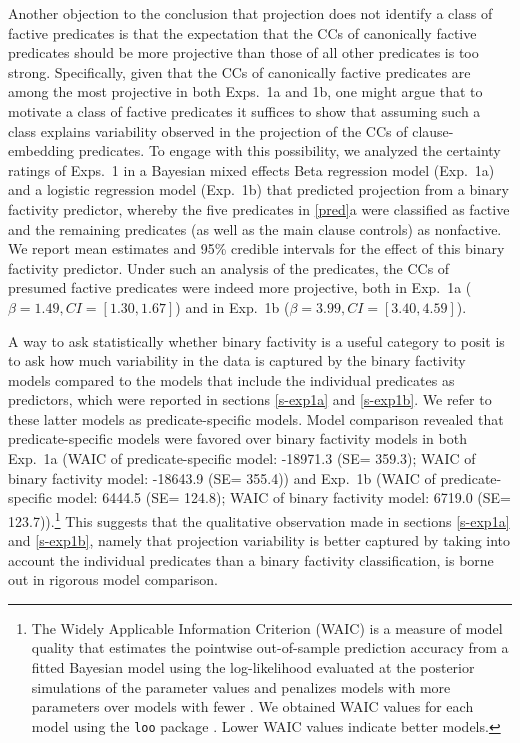 \documentclass{language}
\newcommand{\6}{\mbox{$[\hspace*{-.6mm}[$}}
\newcommand{\9}{\mbox{$]\hspace*{-.6mm}]$}}
\begin{document}
Another objection to the conclusion that projection does not identify a class of factive predicates  is that the expectation that the CCs of canonically factive predicates should be more projective than those of all other predicates is too strong. Specifically, given that the CCs of canonically factive predicates are among the most projective in both Exps.~1a and 1b, one might argue that to motivate a class of factive predicates it suffices to show that assuming such a class explains  variability observed in the projection of the CCs of clause-embedding predicates. To engage with this possibility, we analyzed the certainty ratings of Exps.~1 in a Bayesian mixed effects Beta regression model (Exp.~1a) and a logistic regression model (Exp.~1b) that predicted projection from a binary factivity predictor, whereby the five predicates in \ref{pred}a were classified as factive and the remaining predicates (as well as the main clause controls) as nonfactive. We report mean estimates and 95\% credible intervals for the effect of this binary factivity predictor. Under such an analysis of the predicates, the CCs of presumed factive predicates were indeed more projective, both in Exp.~1a ($\beta = 1.49, CI = [1.30, 1.67]$) and in Exp.~1b ($\beta = 3.99, CI = [3.40,4.59]$). 

A way to ask statistically whether binary factivity is a useful category to posit is to ask how much variability in the data is captured by the binary factivity models compared to the models that include the individual predicates as predictors, which were reported in sections \ref{s-exp1a} and \ref{s-exp1b}. We refer to these latter models as predicate-specific models. Model comparison revealed that predicate-specific models were favored over binary factivity models in both Exp.~1a (WAIC of predicate-specific model: -18971.3 (SE= 359.3); WAIC of binary factivity model: -18643.9 (SE= 355.4))  and Exp.~1b (WAIC of predicate-specific model: 6444.5 (SE= 124.8); WAIC of binary factivity model: 6719.0 (SE= 123.7)).\footnote{The Widely Applicable Information Criterion (WAIC) is a measure of model quality that estimates the pointwise out-of-sample prediction accuracy from a fitted Bayesian model using the log-likelihood evaluated at the posterior simulations of the parameter values and penalizes models with more parameters over models with fewer \citep{watanabe2010}. We obtained WAIC values for each model using the \texttt{loo} package \citep{vehtari2017}. Lower WAIC values indicate better models.} This suggests that the qualitative observation made in sections  \ref{s-exp1a} and \ref{s-exp1b}, namely that projection variability is better captured by taking into account the individual predicates than a binary factivity classification, is borne out in rigorous model comparison. 
\end{document}
